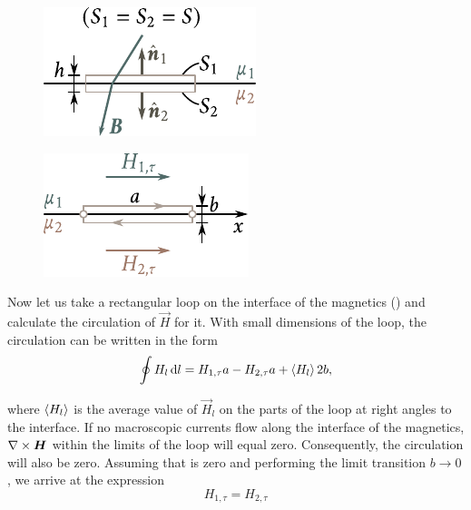 \begin{figure}[t]
	\begin{minipage}[t]{0.48\linewidth}
		\begin{center}
			\includegraphics[scale=1]{figures/ch_07/fig_7_5.pdf}
			\caption[]{}
			\label{fig:7_5}
		\end{center}
	\end{minipage}
	\hfill{ }%
	\begin{minipage}[t]{0.48\linewidth}
		\begin{center}
			\includegraphics[scale=1]{figures/ch_07/fig_7_6.pdf}
			\caption[]{}
			\label{fig:7_6}
		\end{center}
	\end{minipage}
\vspace{-0.4cm}
\end{figure}

Now let us take a rectangular loop on the interface of the magnetics () and calculate the circulation of $\vec{H}$ for it.
With small dimensions of the loop, the circulation can be written in the form
\begin{equation}\label{eq:7_34}
    \oint H_l\, \mathrm{d} l = H_{1,\tau} a - H_{2,\tau} a + \left\langle H_l \right\rangle 2b,
\end{equation}

\noindent
where $\left\langle H_l \right\rangle$ is the average value of $\vec{H}_l$ on the parts of the loop at right angles to the interface.
If no macroscopic currents flow along the interface of the magnetics, $\nabla\times\boldsymbol{H}$ within the limits of the loop will equal zero.
Consequently, the circulation will also be zero.
Assuming that  is zero and performing the limit transition $b\to 0$, we arrive at the expression
\begin{equation}\label{eq:7_35}
    H_{1,\tau} = H_{2,\tau}
\end{equation}

